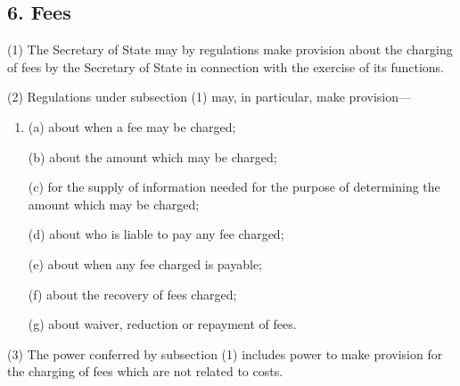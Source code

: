 \documentclass[a4paper]{article}
\begin{document}
%
%
%
%
%

\subsection{6. Fees}

(1) The Secretary of State may by regulations make provision about the charging of fees by the Secretary of State in connection with the exercise of its functions.

(2) Regulations under subsection (1) may, in particular, make provision—
\begin{enumerate}\item[]
(a) about when a fee may be charged;

(b) about the amount which may be charged;

(c) for the supply of information needed for the purpose of determining the amount which may be charged;

(d) about who is liable to pay any fee charged;

(e) about when any fee charged is payable;

(f) about the recovery of fees charged;

(g) about waiver, reduction or repayment of fees.
\end{enumerate}

(3) The power conferred by subsection (1) includes power to make provision for the charging of fees which are not related to costs.
\end{document}
